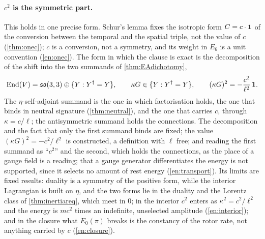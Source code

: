 \paragraph{$c^2$ is the symmetric part.} This holds in one precise form. Schur's lemma fixes the isotropic form $C=c\cdot\mathbf 1$ of the conversion
between the temporal and the spatial triple, not the value of $c$ (\cref{thm:onec}); $c$ is a conversion, not a symmetry, and its weight in $E_6$ is a unit convention
(\cref{en:onec}). The form in which the clause is exact is the decomposition of the shift into the two summands of \cref{thm:EAdichotomy},
\[
\operatorname{End}(V)=\mathfrak{so}(3,3)\oplus\{Y:Y^\dagger=Y\},\qquad \kappa G\in\{Y:Y^\dagger=Y\},\qquad (\kappa G)^2=-\frac{c^2}{\ell^2}\,\mathbf 1 .
\]
The $\eta$-self-adjoint summand is the one in which factorisation holds, the one that binds in neutral signature (\cref{thm:neutral}), and the one
that carries $c$, through $\kappa=c/\ell$; the antisymmetric summand holds the connections. The decomposition and the fact that only the first summand
binds are fixed; the value $(\kappa G)^2=-c^2/\ell^2$ is constructed, a definition with $\ell$ free; and reading the first summand as ``$c^2$'' and the second, which holds the
connections, as the place of a gauge field is a reading; that a gauge generator differentiates the energy is not supported, since it selects no
amount of rest energy (\cref{en:transport}). Its limits are fixed results: duality is a symmetry of the positive form,
while the interior Lagrangian is built on $\eta$, and the two forms lie in the duality and the Lorentz class of \cref{thm:inertiareq}, which meet in $0$;
in the interior $c^2$ enters as $\kappa^2=c^2/\ell^2$ and the energy is $mc^2$ times an indefinite, unselected amplitude (\cref{en:interior}); and in the
closure what $E_0(\pi)$ breaks is the constancy of the rotor rate, not anything carried by $c$ (\cref{en:closure}).

